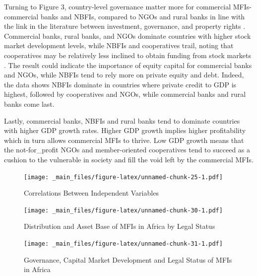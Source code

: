 \documentclass[a4paper, nobind]{templates/ociamthesis}
\begin{document}
Turning to Figure 3, country-level governance matter more for commercial MFIs- commercial banks and NBFIs, compared to NGOs and rural banks in line with the link in the literature between investment, governance, and property rights \autocite{claessens2003financial}. Commercial banks, rural banks, and NGOs dominate countries with higher stock market development levels, while NBFIs and cooperatives trail, noting that cooperatives may be relatively less inclined to obtain funding from stock markets \autocite{porter1987economic}. The result could indicate the importance of equity capital for commercial banks and NGOs, while NBFIs tend to rely more on private equity and debt. Indeed, the data shows NBFIs dominate in countries where private credit to GDP is highest, followed by cooperatives and NGOs, while commercial banks and rural banks come last.

Lastly, commercial banks, NBFIs and rural banks tend to dominate countries with higher GDP growth rates. Higher GDP growth implies higher profitability which in turn allows commercial MFIs to thrive. Low GDP growth means that the not-for\_profit NGOs and member-oriented cooperatives tend to succeed as a cushion to the vulnerable in society and fill the void left by the commercial MFIs.

\newpage

\begin{landscape}

\begin{figure}
\centering
\texttt{[image: \_main\_files/figure-latex/unnamed-chunk-25-1.pdf]}
\caption{\label{fig:unnamed-chunk-25}Correlations Between Independent Variables}
\end{figure}

\begin{figure}
\centering
\texttt{[image: \_main\_files/figure-latex/unnamed-chunk-30-1.pdf]}
\caption{\label{fig:unnamed-chunk-30}Distribution and Asset Base of MFIs in Africa by Legal Status}
\end{figure}

\begin{figure}
\centering
\texttt{[image: \_main\_files/figure-latex/unnamed-chunk-31-1.pdf]}
\caption{\label{fig:unnamed-chunk-31}Governance, Capital Market Development and Legal Status of MFIs in Africa}
\end{figure}

\end{landscape}

\newpage
\end{document}

